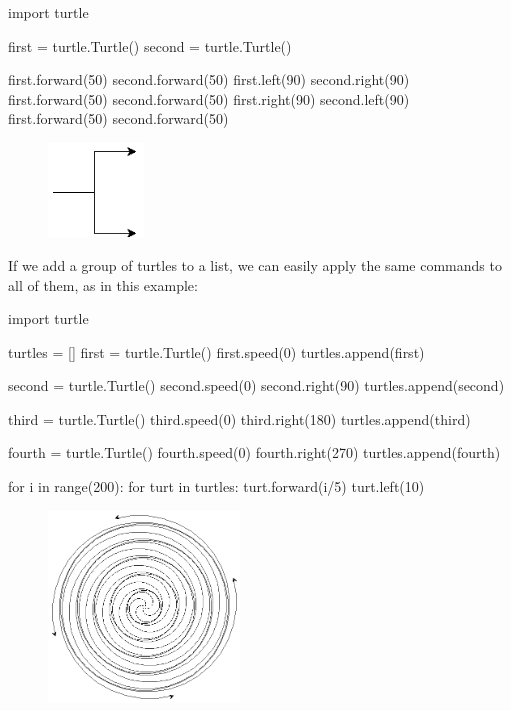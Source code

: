 \documentclass[11pt]{cselabheader}
\begin{document}
\begin{python3code}
import turtle

first = turtle.Turtle()
second = turtle.Turtle()

first.forward(50)
second.forward(50)
first.left(90)
second.right(90)
first.forward(50)
second.forward(50)
first.right(90)
second.left(90)
first.forward(50)
second.forward(50)
\end{python3code}

\begin{figure}[h]
  \centering
  \includegraphics[width=1.0in]{img/turtle_prong}
\end{figure}

If we add a group of turtles to a list, we can easily apply the same commands to all of them, as in this example:

\begin{python3code}
import turtle

turtles = []
first = turtle.Turtle()
first.speed(0)
turtles.append(first)

second = turtle.Turtle()
second.speed(0)
second.right(90)
turtles.append(second)

third = turtle.Turtle()
third.speed(0)
third.right(180)
turtles.append(third)

fourth = turtle.Turtle()
fourth.speed(0)
fourth.right(270)
turtles.append(fourth)

for i in range(200):
    for turt in turtles:
        turt.forward(i/5)
        turt.left(10)
\end{python3code}

\begin{figure}[h]
  \centering
  \includegraphics[width=2.0in]{img/fancy_spiral}
\end{figure}
\end{document}
